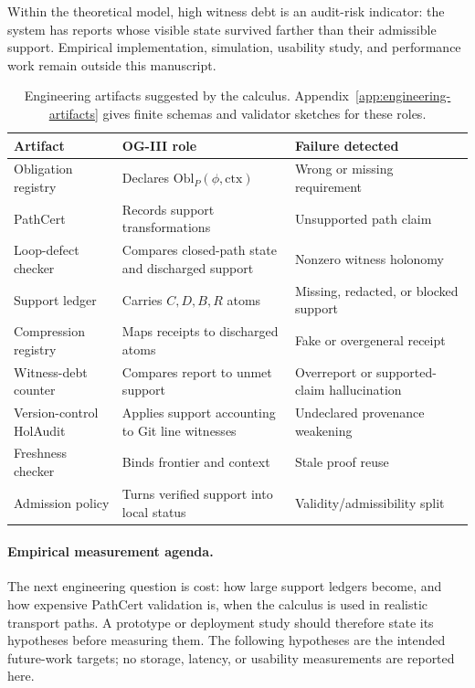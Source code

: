 \documentclass[11pt,twoside]{article}
\newcommand{\OGTableFont}{\small}
\newcommand{\OGTableHeaderRow}{\rowcolor{tableheaderbg}}
\newcommand{\TableHeaderRow}{\OGTableHeaderRow}
\newenvironment{OGTable}[2][ht]{%
  \begin{table}[#1]
  \centering
  #2
  \renewcommand{\arraystretch}{1.08}%
  \rowcolors{2}{tablerowbg}{white}%
}{%
  \rowcolors{2}{}{}%
  \end{table}%
}
\theoremstyle{definition}
\newcommand{\Obl}{\mathrm{Obl}}
\newcommand{\ctx}{\mathrm{ctx}}
\begin{document}
Within the theoretical model, high witness debt is an audit-risk indicator: the
system has reports whose visible state survived farther than their admissible
support. Empirical implementation, simulation, usability study, and performance
work remain outside this manuscript.

\begin{OGTable}{\OGTableFont}
\begin{tabularx}{\textwidth}{>{\raggedright\arraybackslash}p{}>{\raggedright\arraybackslash}p{}>{\raggedright\arraybackslash}X}
\toprule
\TableHeaderRow \textbf{Artifact} & \textbf{OG-III role} & \textbf{Failure detected} \\
\midrule
Obligation registry & Declares $\Obl_P(\phi,\ctx)$ & Wrong or missing requirement \\
PathCert & Records support transformations & Unsupported path claim \\
Loop-defect checker & Compares closed-path state and discharged support & Nonzero witness holonomy \\
Support ledger & Carries $C,D,B,R$ atoms & Missing, redacted, or blocked support \\
Compression registry & Maps receipts to discharged atoms & Fake or overgeneral receipt \\
Witness-debt counter & Compares report to unmet support & Overreport or supported-claim hallucination \\
Version-control HolAudit & Applies support accounting to Git line witnesses & Undeclared provenance weakening \\
Freshness checker & Binds frontier and context & Stale proof reuse \\
Admission policy & Turns verified support into local status & Validity/admissibility split \\
\bottomrule
\end{tabularx}
\caption{Engineering artifacts suggested by the calculus. Appendix~\ref{app:engineering-artifacts} gives finite schemas and validator sketches for these roles.}
\label{tab:engineering-artifacts}
\end{OGTable}
\FloatBarrier

\paragraph{Empirical measurement agenda.}
The next engineering question is cost: how large support ledgers become, and
how expensive PathCert validation is, when the calculus is used in realistic
transport paths. A prototype or deployment study should therefore state its
hypotheses before measuring them. The following hypotheses are the intended
future-work targets; no storage, latency, or usability measurements are
reported here.
\end{document}

